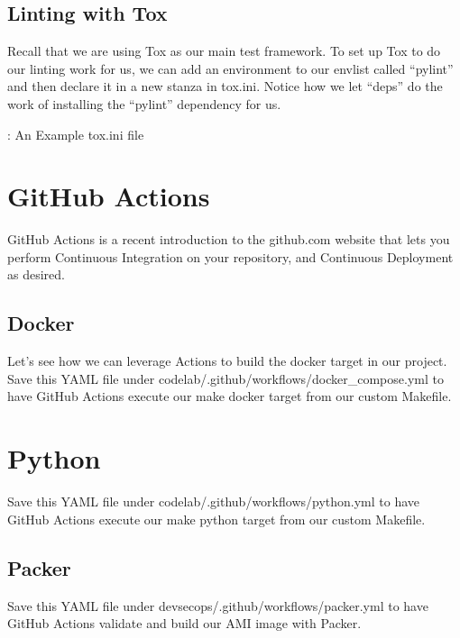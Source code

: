 \subsection{Linting with Tox}

Recall that we are using Tox as our main test framework. To set up Tox
to do our linting work for us, we can add an environment to our envlist
called ``pylint'' and then declare it in a new stanza in tox.ini. Notice
how we let ``deps'' do the work of installing the ``pylint'' dependency for
us.

\begin{mybox}{\thetcbcounter: An Example tox.ini file}
	
\end{mybox}

\section{GitHub Actions}

\justify{}
GitHub Actions is a recent introduction to the github.com website that
lets you perform Continuous Integration on your repository, and Continuous
Deployment as desired.

\subsection{Docker}
\justify{}
Let's see how we can leverage Actions to build the docker target in our
project. Save this YAML file under
codelab/.github/workflows/docker\_compose.yml to have GitHub Actions
execute our make docker target from our custom Makefile.

%	


\section{Python}
\justify{}
Save this YAML file under codelab/.github/workflows/python.yml to have
GitHub Actions execute our make python target from our custom Makefile.

%	

\subsection{Packer}
\justify{}
Save this YAML file under devsecops/.github/workflows/packer.yml to have
GitHub Actions validate and build our AMI image with Packer.


